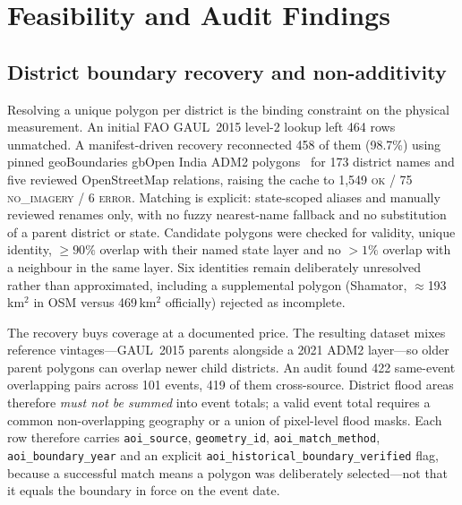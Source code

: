 \documentclass[conference]{IEEEtran}
\begin{document}
\section{Feasibility and Audit Findings}
\subsection{District boundary recovery and non-additivity}\label{sec:boundary}
Resolving a unique polygon per district is the binding constraint on the
physical measurement. An initial FAO GAUL~2015 level-2 lookup left 464 rows
unmatched. A manifest-driven recovery reconnected 458 of them (98.7\%) using
pinned geoBoundaries gbOpen India ADM2 polygons~\cite{runfola2020} for 173
district names and five reviewed OpenStreetMap relations, raising the cache to
1{,}549 \textsc{ok} / 75 \textsc{no\_imagery} / 6 \textsc{error}. Matching is
explicit: state-scoped aliases and manually reviewed renames only, with no fuzzy
nearest-name fallback and no substitution of a parent district or state.
Candidate polygons were checked for validity, unique identity, $\ge 90\%$
overlap with their named state layer and no $>1\%$ overlap with a neighbour in
the same layer. Six identities remain deliberately unresolved rather than
approximated, including a supplemental polygon (Shamator,
$\approx$193\,km$^2$ in OSM versus 469\,km$^2$ officially) rejected as
incomplete.

The recovery buys coverage at a documented price. The resulting dataset mixes
reference vintages---GAUL~2015 parents alongside a 2021 ADM2 layer---so older
parent polygons can overlap newer child districts. An audit found 422
same-event overlapping pairs across 101 events, 419 of them cross-source.
District flood areas therefore \emph{must not be summed} into event totals; a
valid event total requires a common non-overlapping geography or a union of
pixel-level flood masks. Each row therefore carries \texttt{aoi\_source},
\texttt{geometry\_id}, \texttt{aoi\_match\_method},
\texttt{aoi\_boundary\_year} and an explicit
\texttt{aoi\_historical\_boundary\_verified} flag, because a successful match
means a polygon was deliberately selected---not that it equals the boundary in
force on the event date.
\end{document}
